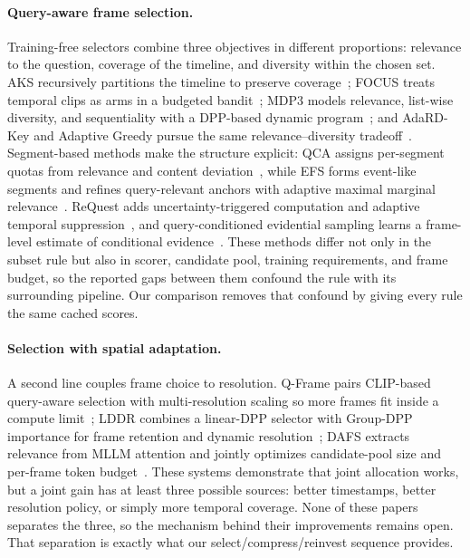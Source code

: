 \documentclass[11pt]{article}
\begin{document}
\paragraph{Query-aware frame selection.}
Training-free selectors combine three objectives in different proportions: relevance to the question, coverage of the timeline, and diversity within the chosen set.
AKS recursively partitions the timeline to preserve coverage~\citep{tang2025aks}; FOCUS treats temporal clips as arms in a budgeted bandit~\citep{zhu2025focus}; MDP3 models relevance, list-wise diversity, and sequentiality with a DPP-based dynamic program~\citep{sun2025mdp3}; and AdaRD-Key and Adaptive Greedy pursue the same relevance--diversity tradeoff~\citep{adardkey2025,adaptivegreedy2026}.
Segment-based methods make the structure explicit: QCA assigns per-segment quotas from relevance and content deviation~\citep{peng2026qca}, while EFS forms event-like segments and refines query-relevant anchors with adaptive maximal marginal relevance~\citep{chen2026efs}.
ReQuest adds uncertainty-triggered computation and adaptive temporal suppression~\citep{kim2026request}, and query-conditioned evidential sampling learns a frame-level estimate of conditional evidence~\citep{wang2026evidential}.
These methods differ not only in the subset rule but also in scorer, candidate pool, training requirements, and frame budget, so the reported gaps between them confound the rule with its surrounding pipeline.
Our comparison removes that confound by giving every rule the same cached scores.

\paragraph{Selection with spatial adaptation.}
A second line couples frame choice to resolution.
Q-Frame pairs CLIP-based query-aware selection with multi-resolution scaling so more frames fit inside a compute limit~\citep{zhang2025qframe}; LDDR combines a linear-DPP selector with Group-DPP importance for frame retention and dynamic resolution~\citep{chen2026lddr}; DAFS extracts relevance from MLLM attention and jointly optimizes candidate-pool size and per-frame token budget~\citep{wang2026dafs}.
These systems demonstrate that joint allocation works, but a joint gain has at least three possible sources: better timestamps, better resolution policy, or simply more temporal coverage.
None of these papers separates the three, so the mechanism behind their improvements remains open.
That separation is exactly what our select/compress/reinvest sequence provides.
\end{document}
